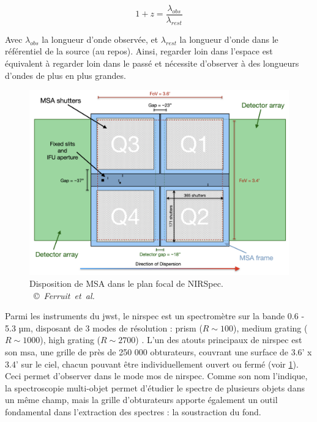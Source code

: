 \documentclass[11pt, a4paper]{article}
\newcommand{\customcite}[2]{\mbox{
  {\small \copyright} \textit{#1} \cite{#2}}
}
\begin{document}
\begin{equation}
    1 + z = \frac{\lambda_{obs}}{\lambda_{rest}}
\end{equation}

Avec $\lambda_{obs}$ la longueur d'onde observée, et $\lambda_{rest}$ la longueur d'onde dans le référentiel de la source (au repos). Ainsi, regarder loin dans l'espace est équivalent à regarder loin dans le passé et nécessite d'observer à des longueurs d'ondes de plus en plus grandes.

\begin{figure}[H]
  \centering
  \includegraphics[scale=0.25]{assets/msa_ds_new.png}
  \caption{Disposition de MSA dans le plan focal de NIRSpec. \customcite{Ferruit et al.}{2022A&A...661A..81F}}
  \label{fig:msa_shutter}
\end{figure}

Parmi les instruments du \gls{jwst}, le \gls{nirspec} est un spectromètre sur la bande 0.6 - 5.3  µm, disposant de 3 modes de résolution : prism ($R \sim 100$), medium grating ($R \sim 1000$), high grating ($R \sim 2700$) \cite{nirspec}. L'un des atouts principaux de \gls{nirspec} est son \gls{msa}, une grille de près de 250 000 obturateurs, couvrant une surface de 3.6' x 3.4' sur le ciel, chacun pouvant être individuellement ouvert ou fermé \cite{msa} (voir \ref{fig:msa_shutter}). Ceci permet d'observer dans le mode \gls{mos} de \gls{nirspec}. Comme son nom l'indique, la spectroscopie multi-objet permet d'étudier le spectre de plusieurs objets dans un même champ, mais la grille d'obturateurs apporte également un outil fondamental dans l'extraction des spectres : la soustraction du fond.
\end{document}
